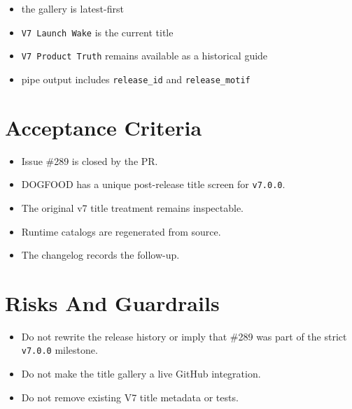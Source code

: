 \begin{itemize}
  \begin{itemize}
  \tightlist
  \item
    the gallery is latest-first
  \item
    \texttt{V\allowbreak{}7\allowbreak{} \allowbreak{}L\allowbreak{}a\allowbreak{}u\allowbreak{}n\allowbreak{}c\allowbreak{}h\allowbreak{} \allowbreak{}W\allowbreak{}a\allowbreak{}k\allowbreak{}e} is the current title
  \item
    \texttt{V\allowbreak{}7\allowbreak{} \allowbreak{}P\allowbreak{}r\allowbreak{}o\allowbreak{}d\allowbreak{}u\allowbreak{}c\allowbreak{}t\allowbreak{} \allowbreak{}T\allowbreak{}r\allowbreak{}u\allowbreak{}t\allowbreak{}h} remains available as a historical guide
  \item
    pipe output includes \texttt{r\allowbreak{}e\allowbreak{}l\allowbreak{}e\allowbreak{}a\allowbreak{}s\allowbreak{}e\allowbreak{}\_\allowbreak{}i\allowbreak{}d} and \texttt{r\allowbreak{}e\allowbreak{}l\allowbreak{}e\allowbreak{}a\allowbreak{}s\allowbreak{}e\allowbreak{}\_\allowbreak{}m\allowbreak{}o\allowbreak{}t\allowbreak{}i\allowbreak{}f}
  \end{itemize}
\end{itemize}

\section{Acceptance Criteria}\label{record-112-acceptance-criteria}

\begin{itemize}
\tightlist
\item
  Issue \#289 is closed by the PR.
\item
  DOGFOOD has a unique post-release title screen for \texttt{v\allowbreak{}7\allowbreak{}.\allowbreak{}0\allowbreak{}.\allowbreak{}0}.
\item
  The original v7 title treatment remains inspectable.
\item
  Runtime catalogs are regenerated from source.
\item
  The changelog records the follow-up.
\end{itemize}

\section{Risks And Guardrails}\label{record-112-risks-and-guardrails}

\begin{itemize}
\tightlist
\item
  Do not rewrite the release history or imply that \#289 was part of the strict \texttt{v\allowbreak{}7\allowbreak{}.\allowbreak{}0\allowbreak{}.\allowbreak{}0} milestone.
\item
  Do not make the title gallery a live GitHub integration.
\item
  Do not remove existing V7 title metadata or tests.
\end{itemize}

